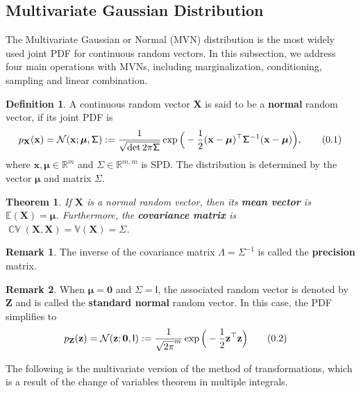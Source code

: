 \documentclass[10pt]{article}
\newtheorem{thm}{Theorem}[section]
\theoremstyle{definition}
\newtheorem{defn}{Definition}[section]
\newtheorem*{rem}{Remark}
\newcommand\eqnum{\addtocounter{equation}{1}\tag{\arabic{section}.\arabic{equation}}}
\DeclareMathOperator{\cov}{\mathbb{CV}}
\begin{document}
\subsection{Multivariate Gaussian Distribution}
The Multivariate Gaussian or Normal (MVN) distribution is the most widely used joint PDF for continuous random vectors. In this subsection, we address four main operations with MVNs, including marginalization, conditioning,  sampling and linear combination.
\begin{defn}
A continuous random vector $\mathbf{X}$ is said to be a \textbf{normal} random vector, if its joint PDF is
\begin{equation*}
p_{\mathbf{X}}(\mathbf{x}) = \mathcal{N}(\mathbf{x};\boldsymbol{\mu},\mathsf{\Sigma}) := 
\frac{1}{\sqrt{\det2\pi\mathsf{\Sigma}}}
\exp\Big(-\frac{1}{2}(\mathbf{x} - \boldsymbol{\mu})^{\top}\mathsf{\Sigma}^{-1}(\mathbf{x} - \boldsymbol{\mu})\Big),
\eqnum
\label{eq:RV:N:PDF}
\end{equation*}
where $\mathbf{x}, \boldsymbol{\mu} \in \mathbb{R}^m$ and $\mathsf{\Sigma} \in \mathbb{R}^{m,m}$ is SPD. The distribution is determined by the vector $\boldsymbol{\mu}$ and matrix $\mathsf{\Sigma}$. 
\end{defn}
\begin{thm}
If $\mathbf{X}$ is a normal random vector, then its \textbf{mean vector} is $\mathbb{E}(\mathbf{X})=\boldsymbol{\mu}$. Furthermore, the \textbf{covariance matrix} is $\cov(\mathbf{X}, \mathbf{X})=\mathbb{V}(\mathbf{X})=\mathsf{\Sigma}$.
\end{thm}
\begin{rem}
The inverse of the covariance matrix $\mathsf{\Lambda} = \mathsf{\Sigma}^{-1}$ is called the \textbf{precision} matrix.
\end{rem}
\begin{rem}
When $\boldsymbol{\mu} = \mathbf{0}$ and $\mathsf{\Sigma} = \mathsf{I}$, the associated random vector is denoted by $\mathbf{Z}$ and is called the \textbf{standard normal}  random vector. In this case, the PDF simplifies to
\begin{align*}
p_{\mathbf{Z}}(\mathbf{z}) &=  \mathcal{N}(\mathbf{z};\boldsymbol{0},\mathsf{I}) := \frac{1}{\sqrt{2\pi}^m}
\exp\Big(-\frac{1}{2}\mathbf{z}^{\top}\mathbf{z}\Big)
\eqnum
\end{align*}
\end{rem}
The following is the multivariate version of the method of transformations, which is a result of the change of variables theorem in multiple integrals.
\end{document}
